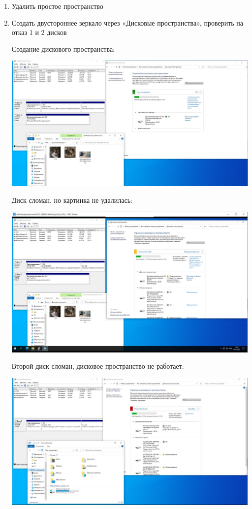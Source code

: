 \documentclass[a4paper,14pt]{extarticle}
\begin{document}
\begin{enumerate}
		\item Удалить простое пространство
		\item Создать двустороннее зеркало через «Дисковые пространства»,
		проверить на отказ 1 и 2 дисков
		
		Создание дискового пространства:
		\begin{center}
			\includegraphics[width=\textwidth]{12}
		\end{center}
		
		\newpage
		Диск сломан, но картинка не удалилась:
		\begin{center}
			\includegraphics[width=\textwidth]{13}
		\end{center}
		
		Второй диск сломан, дисковое пространство не работает:
		\begin{center}
			\includegraphics[width=\textwidth]{14}
		\end{center}
		

\end{enumerate}
\end{document}
